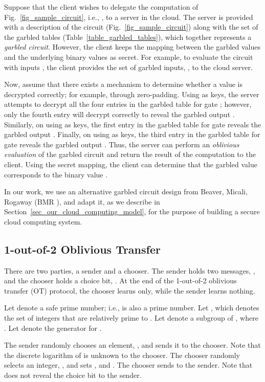 \documentclass[10pt,journal,cspaper,compsoc]{IEEEtran}
\begin{document}
Suppose that the client wishes to delegate the computation of Fig.~\ref{fig_sample_circuit}, i.e., , to a server in the cloud. The server is provided with a description of the circuit (Fig.~\ref{fig_sample_circuit}) along with the set of the garbled tables (Table~\ref{table_garbled_tables}), which together represents a {\em garbled circuit}. However, the client keeps the mapping between the garbled values and the underlying binary values as secret. For example, to evaluate the circuit with inputs , the client provides the set of garbled inputs, , to the cloud server.


Now, assume that there exists a mechanism to determine whether a value is decrypted correctly; for example, through zero-padding. Using  as keys, the server attempts to decrypt all the four entries in the garbled table for gate ; however, only the fourth entry will decrypt correctly to reveal the garbled output . Similarly, on using  as keys, the first entry in the garbled table for gate  reveals the garbled output . Finally, on using  as keys, the third entry in the garbled table for gate  reveals the garbled output . Thus, the server can perform an {\em oblivious evaluation} of the garbled circuit and return the result of the computation  to the client. Using the secret mapping, the client can determine that the garbled value  corresponds to the binary value .


In our work, we use an alternative garbled circuit design from Beaver, Micali, Rogaway (BMR \cite{beaver90,rogaway91}), and adapt it, as we describe in Section~\ref{sec_our_cloud_computing_model}, for the purpose of building a secure cloud computing system.


\subsection{1-out-of-2 Oblivious Transfer}
\label{sec_1_out_of_2_OT}
There are two parties, a sender and a chooser. The sender holds two messages, , and the chooser holds a choice bit, . At the end of the 1-out-of-2 oblivious transfer (OT) protocol, the chooser learns  only, while the sender learns nothing.


Let  denote a safe prime number; i.e.,  is also a prime number. Let , which denotes the set of integers that are relatively prime to . Let  denote a subgroup of , where . Let  denote the generator for .


The sender randomly chooses an element, , and sends it to the chooser. Note that the discrete logarithm of  is unknown to the chooser. The chooser randomly selects an integer, , and sets , and . The chooser sends  to the sender. Note that  does not reveal the choice bit  to the sender.
\end{document}
